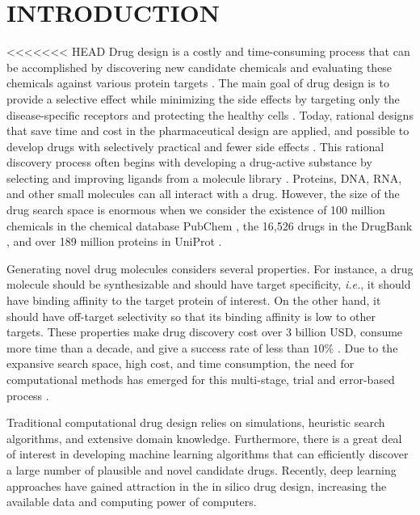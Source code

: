 \chapter{INTRODUCTION}
<<<<<<< HEAD
\label{chapter:intro}
Drug design is a costly and time-consuming process that can be accomplished by discovering new candidate chemicals and evaluating these chemicals against various protein targets \cite{csermely2013structure}. The main goal of drug design is to provide a selective effect while minimizing the side effects by targeting only the disease-specific receptors and protecting the healthy cells \cite{hughes2011principles}. Today, rational designs that save time and cost in the pharmaceutical design are applied, and possible to develop drugs with selectively practical and fewer side effects \cite{huggins2012rational}. This rational discovery process often begins with developing a drug-active substance by selecting and improving ligands from a molecule library \cite{wen2015drug}. Proteins, DNA, RNA, and other small molecules can all interact with a drug. However, the size of the drug search space is enormous when we consider the existence of 100 million chemicals in the chemical database PubChem \cite{bolton2008pubchem}, the 16,526 drugs in the DrugBank \cite{law2013drugbank}, and over 189 million proteins in UniProt \cite{uniprot2021uniprot}.

Generating novel drug molecules considers several properties. For instance, a drug molecule should be synthesizable and should have target specificity, \textit{i.e.}, it should have binding affinity to the target protein of interest. On the other hand, it should have off-target selectivity so that its binding affinity is low to other targets. These properties make drug discovery cost over 3 billion USD, consume more time than a decade, and give a success rate of less than $10\%$ \cite{matthews2016omics}. Due to the expansive search space, high cost, and time consumption, the need for computational methods has emerged for this multi-stage, trial and error-based process \cite{yu2017computer}. 

Traditional computational drug design relies on simulations, heuristic search algorithms, and extensive domain knowledge. Furthermore, there is a great deal of interest in developing machine learning algorithms that can efficiently discover a large number of plausible and novel candidate drugs. Recently, deep learning approaches have gained attraction in the in silico drug design, increasing the available data and computing power of computers. 

